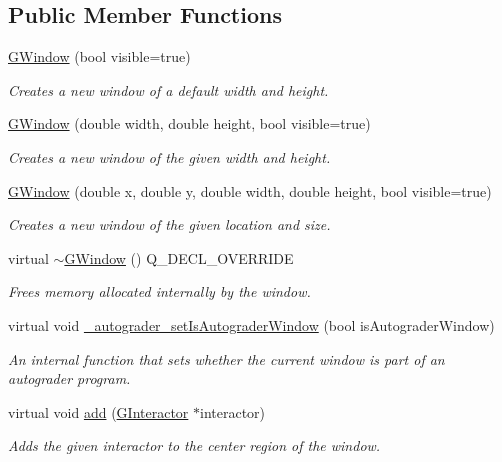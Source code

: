 \subsection*{Public Member Functions}
\begin{DoxyCompactItemize}
\item 
\mbox{\hyperlink{classGWindow_a7fdeab875fb526a49423085ac13ac9f2}{G\+Window}} (bool visible=true)
\begin{DoxyCompactList}\small\item\em Creates a new window of a default width and height. \end{DoxyCompactList}\item 
\mbox{\hyperlink{classGWindow_acb88532777f61b140aa8245ed1d9887e}{G\+Window}} (double width, double height, bool visible=true)
\begin{DoxyCompactList}\small\item\em Creates a new window of the given width and height. \end{DoxyCompactList}\item 
\mbox{\hyperlink{classGWindow_ac66942f456baa6c43ecd0ed60138fe36}{G\+Window}} (double x, double y, double width, double height, bool visible=true)
\begin{DoxyCompactList}\small\item\em Creates a new window of the given location and size. \end{DoxyCompactList}\item 
virtual \mbox{\hyperlink{classGWindow_a4e024d2943027c4d4213a36fef7cfb23}{$\sim$\+G\+Window}} () Q\+\_\+\+D\+E\+C\+L\+\_\+\+O\+V\+E\+R\+R\+I\+DE
\begin{DoxyCompactList}\small\item\em Frees memory allocated internally by the window. \end{DoxyCompactList}\item 
virtual void \mbox{\hyperlink{classGWindow_a458811bab688db3875a6806b3ba4d938}{\+\_\+autograder\+\_\+set\+Is\+Autograder\+Window}} (bool is\+Autograder\+Window)
\begin{DoxyCompactList}\small\item\em An internal function that sets whether the current window is part of an autograder program. \end{DoxyCompactList}\item 
virtual void \mbox{\hyperlink{classGWindow_a6f99b7c841256dbdc5acaafbbca4e685}{add}} (\mbox{\hyperlink{classGInteractor}{G\+Interactor}} $\ast$interactor)
\begin{DoxyCompactList}\small\item\em Adds the given interactor to the center region of the window. \end{DoxyCompactList}\item 

\end{DoxyCompactItemize}
